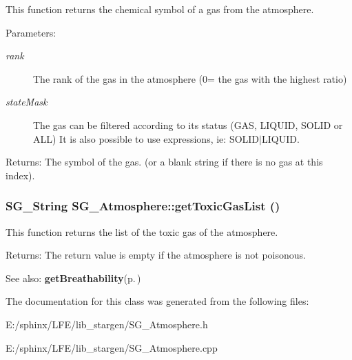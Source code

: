This function returns the chemical symbol of a gas from the atmosphere. 

\begin{Desc}
\item[Parameters:]
\begin{description}
\item[{\em rank}]The rank of the gas in the atmosphere (0= the gas with the highest ratio) \item[{\em state\-Mask}]The gas can be filtered according to its status (GAS, LIQUID, SOLID or ALL) It is also possible to use expressions, ie: SOLID$|$LIQUID. \end{description}
\end{Desc}
\begin{Desc}
\item[Returns:]The symbol of the gas. (or a blank string if there is no gas at this index). \end{Desc}
\subsubsection{\setlength{\rightskip}{0pt plus 5cm}SG\_\-String SG\_\-Atmosphere::get\-Toxic\-Gas\-List ()}\label{class_s_g___atmosphere_a4}


This function returns the list of the toxic gas of the atmosphere. 

\begin{Desc}
\item[Returns:]The return value is empty if the atmosphere is not poisonous. \end{Desc}
\begin{Desc}
\item[See also:]{\bf get\-Breathability}{\rm (p.\,\pageref{class_s_g___atmosphere_a3})} \end{Desc}


The documentation for this class was generated from the following files:\begin{CompactItemize}
\item 
E:/sphinx/LFE/lib\_\-stargen/SG\_\-Atmosphere.h\item 
E:/sphinx/LFE/lib\_\-stargen/SG\_\-Atmosphere.cpp\end{CompactItemize}
